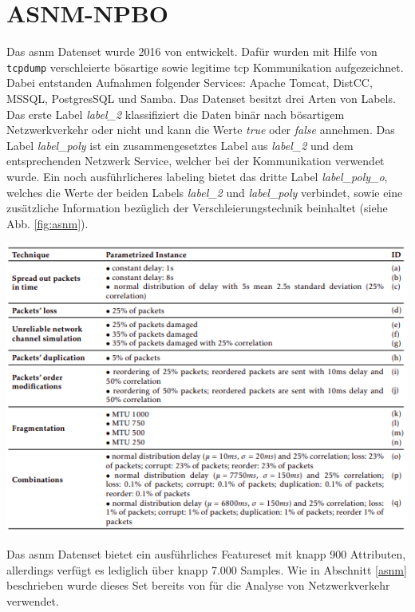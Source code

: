 \documentclass[
    12pt, %
    DIV10,
    ngerman, %
    a4paper, %
    oneside, %
    titlepage, %
    parskip=half, %
    headings=normal, %
    listof=totoc, %
    bibliography=totoc, %
    index=totoc, %
    captions=tableheading, %
    final %
]{scrreprt}
\begin{document}
\section{ASNM-NPBO}
Das \ac{asnm} Datenset wurde 2016 von \textcite{phdthesis} entwickelt. Dafür wurden mit Hilfe von \texttt{tcpdump} verschleierte bösartige sowie legitime \ac{tcp} Kommunikation aufgezeichnet. Dabei entstanden Aufnahmen folgender Services: Apache Tomcat, DistCC, MSSQL, PostgresSQL und Samba. Das Datenset besitzt drei Arten von Labels. Das erste Label \emph{label\_2} klassifiziert die Daten binär nach bösartigem Netzwerkverkehr oder nicht und kann die Werte \emph{true} oder \emph{false} annehmen. Das Label \emph{label\_poly} ist ein zusammengesetztes Label aus \emph{label\_2} und dem entsprechenden Netzwerk Service, welcher bei der Kommunikation verwendet wurde. Ein noch ausführlicheres labeling bietet das dritte Label \emph{label\_poly\_o}, welches die Werte der beiden Labels \emph{label\_2} und \emph{label\_poly} verbindet, sowie eine zusätzliche Information bezüglich der Verschleierungstechnik beinhaltet (siehe Abb. \ref{fig:asnm}).
\begin{center}
\includegraphics[scale=0.7]{img/asnm.png}
\label{fig:asnm}
\end{center}
Das \ac{asnm} Datenset bietet ein ausführliches Featureset mit knapp 900 Attributen, allerdings verfügt es lediglich über knapp 7.000 Samples. Wie in Abschnitt \ref{asnm} beschrieben wurde dieses Set bereits von \textcite{Teoh2018} für die Analyse von Netzwerkverkehr verwendet.
\end{document}
